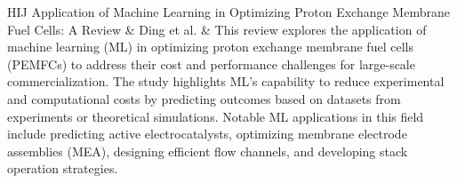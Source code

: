 \begin{table}[H]
\begin{tabularx}{\textwidth}{HIJ}
    \midrule
    Application of Machine Learning in Optimizing Proton Exchange Membrane Fuel Cells: A Review & Ding et al. & This review explores the application of machine learning (ML) in optimizing proton exchange membrane fuel cells (PEMFCs) to address their cost and performance challenges for large-scale commercialization. The study highlights ML's capability to reduce experimental and computational costs by predicting outcomes based on datasets from experiments or theoretical simulations. Notable ML applications in this field include predicting active electrocatalysts, optimizing membrane electrode assemblies (MEA), designing efficient flow channels, and developing stack operation strategies. \\
    \midrule
     \\
    \bottomrule
    \end{tabularx}
    \end{table}

